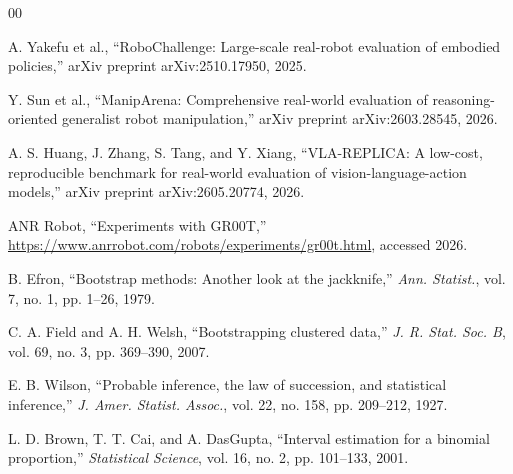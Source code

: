 \begin{thebibliography}{00}

A. Yakefu et al.,
``RoboChallenge: Large-scale real-robot evaluation of embodied
policies,''
arXiv preprint arXiv:2510.17950, 2025.

Y. Sun et al.,
``ManipArena: Comprehensive real-world evaluation of reasoning-oriented
generalist robot manipulation,''
arXiv preprint arXiv:2603.28545, 2026.

A. S. Huang, J. Zhang, S. Tang, and Y. Xiang,
``VLA-REPLICA: A low-cost, reproducible benchmark for real-world
evaluation of vision-language-action models,''
arXiv preprint arXiv:2605.20774, 2026.

ANR Robot, ``Experiments with GR00T,'' \url{https://www.anrrobot.com/robots/experiments/gr00t.html}, accessed 2026.

B. Efron,
``Bootstrap methods: Another look at the jackknife,''
\emph{Ann. Statist.}, vol. 7, no. 1, pp. 1--26, 1979.

C. A. Field and A. H. Welsh,
``Bootstrapping clustered data,''
\emph{J. R. Stat. Soc. B}, vol. 69, no. 3, pp. 369--390, 2007.

E. B. Wilson,
``Probable inference, the law of succession, and statistical inference,''
\emph{J. Amer. Statist. Assoc.},
vol. 22, no. 158, pp. 209--212, 1927.

L. D. Brown, T. T. Cai, and A. DasGupta,
``Interval estimation for a binomial proportion,''
\emph{Statistical Science},
vol. 16, no. 2, pp. 101--133, 2001.

\end{thebibliography}
